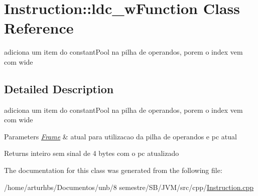 \hypertarget{classInstruction_1_1ldc__wFunction}{}\section{Instruction\+:\+:ldc\+\_\+w\+Function Class Reference}
\label{classInstruction_1_1ldc__wFunction}


adiciona um item do constant\+Pool na pilha de operandos, porem o index vem com wide  




\subsection{Detailed Description}
adiciona um item do constant\+Pool na pilha de operandos, porem o index vem com wide 


\begin{DoxyParams}{Parameters}
{\em \hyperlink{classFrame}{Frame}} & atual para utilizacao da pilha de operandos e pc atual \\
\hline
\end{DoxyParams}
\begin{DoxyReturn}{Returns}
inteiro sem sinal de 4 bytes com o pc atualizado 
\end{DoxyReturn}


The documentation for this class was generated from the following file\+:\begin{DoxyCompactItemize}
\item 
/home/arturhbs/\+Documentos/unb/8 semestre/\+S\+B/\+J\+V\+M/src/cpp/\hyperlink{Instruction_8cpp}{Instruction.\+cpp}\end{DoxyCompactItemize}
